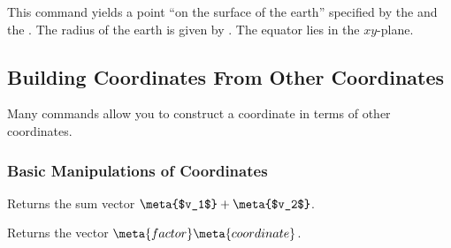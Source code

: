 \begin{command}{\pgfpointspherical{}}
    This command yields a point ``on the surface of the earth'' specified by
    the  and the . The radius of the earth is
    given by . The equator lies in the $xy$-plane.
\begin{codeexample}[]
\end{codeexample}
\end{command}


\subsection{Building Coordinates From Other Coordinates}

Many commands allow you to construct a coordinate in terms of other
coordinates.


\subsubsection{Basic Manipulations of Coordinates}

\begin{command}{\pgfpointadd{}}
    Returns the sum vector $\meta{$v_1$} + \meta{$v_2$}$.
\begin{codeexample}[]
\end{codeexample}
\end{command}

\begin{command}{\pgfpointscale{}}
    Returns the vector $\meta{factor}\meta{coordinate}$.
\begin{codeexample}[]
\end{codeexample}
\end{command}

